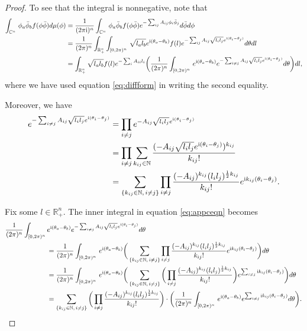 \documentclass[a4paper, 11pt]{article}
\newcommand{\compi}{\textnormal{i}}
\begin{document}
\begin{proof}
To see that
the integral is nonnegative, note that
    \begin{align}   \label{eq:appceqn}
    \int_{\mathbb{C}^n}\, \phi_a\bar{\phi}_b f(\phi\bar{\phi}) d\mu(\phi) & = \frac{1}{(2\pi\compi)^n}\int_{\mathbb{C}^n}\, \phi_a\bar{\phi}_b f(\phi\bar{\phi}) e^{-\sum_{ij} A_{ij}\phi_i\bar{\phi}_j} d\bar{\phi}d\phi \nonumber\\
    & = \frac{1}{(2\pi)^n}\int_{\mathbb{R}_+^n}\int_{[0,2\pi)^n}\, \sqrt{l_a l_b}e^{\compi(\theta_a-\theta_b)} f(l) e^{-\sum_{ij} A_{ij}\sqrt{l_i l_j}e^{\compi(\theta_i-\theta_j)}} d\theta dl \nonumber\\
    & = \int_{\mathbb{R}_+^n}\sqrt{l_a l_b} f(l) e^{-\sum_{i} A_{ii}l_i}\bigg(\frac{1}{(2\pi)^n}\int_{[0,2\pi)^n}\, e^{\compi(\theta_a-\theta_b)}   e^{-\sum_{i\neq j} A_{ij}\sqrt{l_i l_j}e^{\compi(\theta_i-\theta_j)}} d\theta\bigg) dl,
    \end{align}
where we have used equation \eqref{eq:diffform} in writing the second equality.

Moreover, we have
    \begin{align*}
    e^{-\sum_{i\neq j} A_{ij}\sqrt{l_i l_j}e^{\compi(\theta_i-\theta_j)}} & = \prod_{i\neq j}e^{- A_{ij}\sqrt{l_i l_j}e^{\compi(\theta_i-\theta_j)}}\\
    & = \prod_{i\neq j}\sum_{k_{ij}\in\mathbb{N}} \frac{(- A_{ij}\sqrt{l_i l_j}e^{\compi(\theta_i-\theta_j)})^{k_{ij}}}{k_{ij}!}\\
    & = \sum_{\{k_{ij}\in\mathbb{N}, \,i\neq j\}}\prod_{i\neq j} \frac{(- A_{ij})^{k_{ij}}(l_i l_j)^{\frac{1}{2}k_{ij}}}{k_{ij}!}e^{\compi k_{ij}(\theta_i-\theta_j)}.
    \end{align*}

Fix some $l\in\mathbb{R}_+^n$. The inner integral in equation \eqref{eq:appceqn} becomes
    \begin{align*}
    \frac{1}{(2\pi)^n}\int_{[0,2\pi)^n}\, & e^{\compi(\theta_a-\theta_b)}   e^{-\sum_{i\neq j} A_{ij}\sqrt{l_i l_j}e^{\compi(\theta_i-\theta_j)}} d\theta \\
    &= \frac{1}{(2\pi)^n}\int_{[0,2\pi)^n}\, e^{\compi(\theta_a-\theta_b)}\bigg(\sum_{\{k_{ij}\in\mathbb{N}, \,i\neq j\}}\prod_{i\neq j} \frac{(- A_{ij})^{k_{ij}}(l_i l_j)^{\frac{1}{2}k_{ij}}}{k_{ij}!}e^{\compi k_{ij}(\theta_i-\theta_j)}\bigg) d\theta  \\
    &= \frac{1}{(2\pi)^n}\int_{[0,2\pi)^n}\, e^{\compi(\theta_a-\theta_b)}\bigg(\sum_{\{k_{ij}\in\mathbb{N}, \,i\neq j\}}\bigg(\prod_{i\neq j} \frac{(- A_{ij})^{k_{ij}}(l_i l_j)^{\frac{1}{2}k_{ij}}}{k_{ij}!}\bigg)e^{\sum_{i\neq j}\compi k_{ij}(\theta_i-\theta_j)}\bigg) d\theta  \\
    &= \sum_{\{k_{ij}\in\mathbb{N}, \,i\neq j\}}\bigg(\prod_{i\neq j} \frac{(- A_{ij})^{k_{ij}}(l_i l_j)^{\frac{1}{2}k_{ij}}}{k_{ij}!}\bigg)\cdot\bigg(\frac{1}{(2\pi)^n}\int_{[0,2\pi)^n}\, e^{\compi(\theta_a-\theta_b)}e^{\sum_{i\neq j}\compi k_{ij}(\theta_i-\theta_j)} d\theta\bigg).
    \end{align*}


\end{proof}
\end{document}
